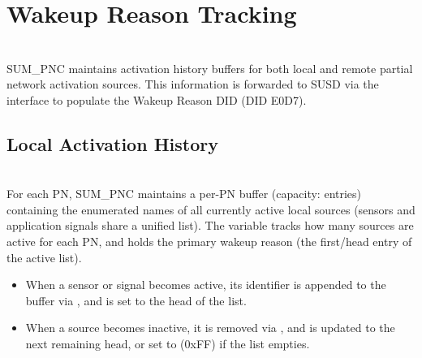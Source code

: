 \section{Wakeup Reason Tracking}
\label{sec:WakeupReasonTracking}
\\
SUM\_PNC maintains activation history buffers for both local and remote partial network activation sources. This information is forwarded to SUSD via the  interface to populate the Wakeup Reason DID (DID E0D7).

{ }

\subsection{Local Activation History}
\\
For each PN, SUM\_PNC maintains a per-PN buffer  (capacity:  entries) containing the enumerated names of all currently active local sources (sensors and application signals share a unified list). The variable  tracks how many sources are active for each PN, and  holds the primary wakeup reason (the first/head entry of the active list).
\\
\begin{itemize}
  \item When a sensor or signal becomes active, its identifier is appended to the buffer via , and  is set to the head of the list.
  \item When a source becomes inactive, it is removed via , and  is updated to the next remaining head, or set to  (0xFF) if the list empties.
\end{itemize}

{}

